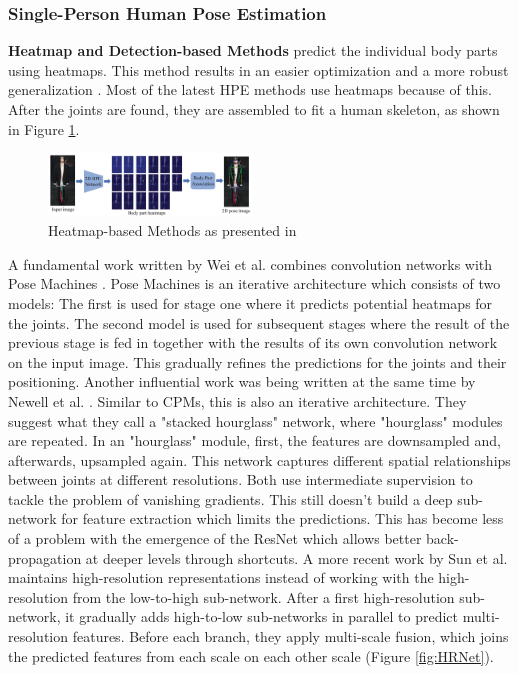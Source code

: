 \documentclass[conference]{IEEEtran}
\begin{document}
\subsubsection{Single-Person Human Pose Estimation}
\textbf{Heatmap and Detection-based Methods} predict the individual body parts using heatmaps.
This method results in an easier optimization and a more robust generalization \cite{chen2022}.
Most of the latest HPE methods use heatmaps because of this.
After the joints are found, they are assembled to fit a human skeleton, as shown in Figure \ref{fig:single_pose_estimation_heatmap-based_methods}.

\begin{figure}[h]
	\centering
	\includegraphics[width=0.48\textwidth]{single_pose_estimation_heatmap-based_methods}%
	\caption{Heatmap-based Methods as presented in \cite{Zheng2012}}
	\label{fig:single_pose_estimation_heatmap-based_methods}
\end{figure}

A fundamental work written by Wei et al. \cite{Wei2016} combines convolution networks with Pose Machines \cite{Ramakrishna2014}.
Pose Machines is an iterative architecture which consists of two models:
The first is used for stage one where it predicts potential heatmaps for the joints.
The second model is used for subsequent stages where the result of the previous stage is fed in together with the results of its own convolution network on the input image. 
This gradually refines the predictions for the joints and their positioning.
Another influential work was being written at the same time by Newell et al. \cite{Newell2016}.
Similar to CPMs, this is also an iterative architecture.
They suggest what they call a "stacked hourglass" network, where "hourglass" modules are repeated.
In an "hourglass" module, first, the features are downsampled and, afterwards, upsampled again.
This network captures different spatial relationships between joints at different resolutions.
Both use intermediate supervision to tackle the problem of vanishing gradients.
This still doesn't build a deep sub-network for feature extraction which limits the predictions.
This has become less of a problem with the emergence of the ResNet \cite{He2015} which allows better back-propagation at deeper levels through shortcuts.
A more recent work by Sun et al. \cite{Sun2019} maintains high-resolution representations instead of working with the high-resolution from the low-to-high sub-network.
After a first high-resolution sub-network, it gradually adds high-to-low sub-networks in parallel to predict multi-resolution features.
Before each branch, they apply multi-scale fusion, which joins the predicted features from each scale on each other scale (Figure \ref{fig:HRNet}).
\end{document}
